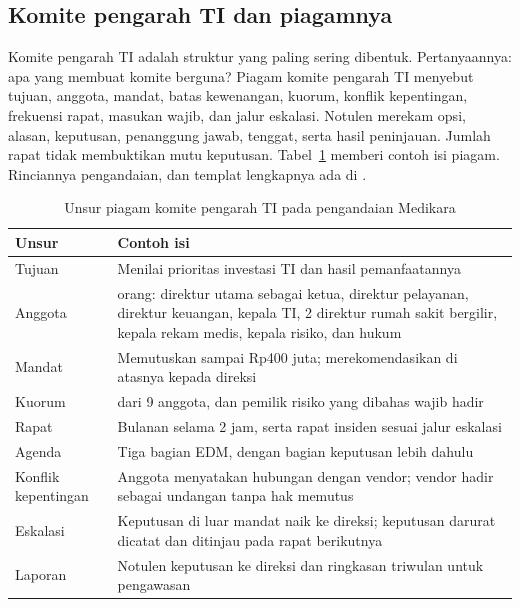 \subsection*{Komite pengarah TI dan piagamnya}

Komite pengarah TI adalah struktur yang paling sering dibentuk. Pertanyaannya: apa yang
membuat komite berguna? Piagam komite pengarah TI menyebut tujuan, anggota, mandat, batas
kewenangan, kuorum, konflik kepentingan, frekuensi rapat, masukan wajib, dan jalur eskalasi.
Notulen merekam opsi, alasan, keputusan, penanggung jawab, tenggat, serta hasil peninjauan.
Jumlah rapat tidak membuktikan mutu keputusan. Tabel~\ref{tab:ch02-piagam} memberi contoh isi
piagam. Rinciannya pengandaian, dan templat lengkapnya ada di
.

\begin{table}[!htb]
  \centering\small
  \caption{Unsur piagam komite pengarah TI pada pengandaian Medikara}
  \label{tab:ch02-piagam}
  \begin{tabularx}{\textwidth}{|>{\raggedright\arraybackslash}p{}|>{\raggedright\arraybackslash}X|}
    \hline
    \textbf{Unsur} & \textbf{Contoh isi} \\ \hline
    Tujuan & Menilai prioritas investasi TI dan hasil pemanfaatannya \\ \hline
    Anggota & 9 orang: direktur utama sebagai ketua, direktur pelayanan, direktur keuangan,
    kepala TI, 2 direktur rumah sakit bergilir, kepala rekam medis, kepala risiko, dan hukum
    \\ \hline
    Mandat & Memutuskan sampai Rp400 juta; merekomendasikan di atasnya kepada direksi \\
    \hline
    Kuorum & 6 dari 9 anggota, dan pemilik risiko yang dibahas wajib hadir \\ \hline
    Rapat & Bulanan selama 2 jam, serta rapat insiden sesuai jalur eskalasi \\ \hline
    Agenda & Tiga bagian EDM, dengan bagian keputusan lebih dahulu \\ \hline
    Konflik kepentingan & Anggota menyatakan hubungan dengan vendor; vendor hadir sebagai
    undangan tanpa hak memutus \\ \hline
    Eskalasi & Keputusan di luar mandat naik ke direksi; keputusan darurat dicatat dan
    ditinjau pada rapat berikutnya \\ \hline
    Laporan & Notulen keputusan ke direksi dan ringkasan triwulan untuk pengawasan \\ \hline
  \end{tabularx}
\end{table}

